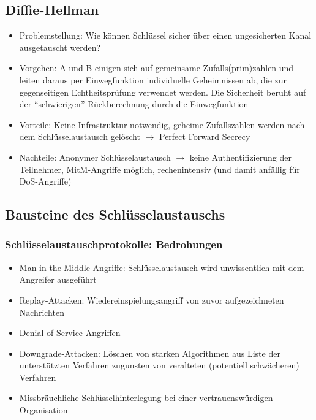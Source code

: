 \subsection{Diffie-Hellman}
\begin{itemize}
	\item Problemstellung: Wie können Schlüssel sicher über einen ungesicherten Kanal ausgetauscht werden?
	\item Vorgehen: A und B einigen sich auf gemeinsame Zufalls(prim)zahlen und leiten daraus per Einwegfunktion individuelle Geheimnissen ab, die zur gegenseitigen Echtheitsprüfung verwendet werden. Die Sicherheit beruht auf der "`schwierigen"' Rückberechnung durch die Einwegfunktion
	\item Vorteile: Keine Infrastruktur notwendig, geheime Zufallszahlen werden nach dem Schlüsselaustausch gelöscht \(\rightarrow\) Perfect Forward Secrecy
	\item Nachteile: Anonymer Schlüsselaustausch \(\rightarrow\) keine Authentifizierung der Teilnehmer, MitM-Angriffe möglich, rechenintensiv (und damit anfällig für DoS-Angriffe)
\end{itemize}


\subsection{Bausteine des Schlüsselaustauschs}

\subsubsection{Schlüsselaustauschprotokolle: Bedrohungen}
\begin{itemize}
	\item Man-in-the-Middle-Angriffe: Schlüsselaustausch wird unwissentlich mit dem Angreifer ausgeführt
	\item Replay-Attacken: Wiedereinspielungsangriff von zuvor aufgezeichneten Nachrichten
	\item Denial-of-Service-Angriffen
	\item Downgrade-Attacken: Löschen von starken Algorithmen aus Liste der unterstützten Verfahren zugunsten von veralteten (potentiell schwächeren) Verfahren
	\item Missbräuchliche Schlüsselhinterlegung bei einer vertrauenswürdigen Organisation
\end{itemize}

